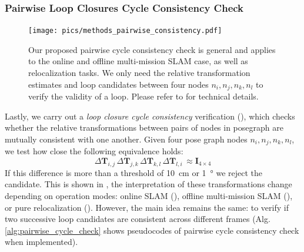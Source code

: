 \subsubsection*{\textbf{Pairwise Loop Closures Cycle Consistency Check}}
\begin{figure}[htbp]
  \centering
  \texttt{[image: pics/methods\_pairwise\_consistency.pdf]}
  \caption{Our proposed pairwise cycle consistency check is general and applies to the online and offline multi-mission SLAM case, as well as relocalization tasks. We only need the relative transformation estimates and loop candidates between four nodes $n_i, n_j, n_k, n_l$ to verify the validity of a loop. Please refer to  for technical details.}
  \label{fig:cycle-consistency}
\end{figure}
Lastly, we carry out a \emph{loop closure cycle consistency} verification (), which checks whether the relative transformations between pairs of nodes in posegraph are mutually consistent with one another. Given four pose graph nodes $n_i, n_j, n_k, n_l$, we test how close the following equivalence holds:
\begin{equation}
\Delta\mathbf{T}_{i,j}\, \Delta\mathbf{T}_{j,k}\, \Delta\mathbf{T}_{k,l}\, \Delta\mathbf{T}_{l,i}\, \approx \mathbf{I}_{4\times4} 
\end{equation}
If this difference is more than a threshold of \SI{10}{\centi\meter} or \SI{1}{\degree} we reject the candidate. This is shown in , the interpretation of these transformations change depending on operation modes: online SLAM (), offline multi-mission SLAM (), or pure relocalization (). However, the main idea remains the same: to verify if two successive loop candidates are consistent across different frames (Alg.\ref{alg:pairwise_cycle_check} shows pseudocodes of pairwise cycle consistency check when implemented).


